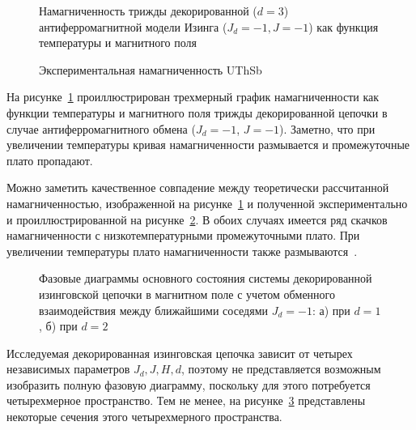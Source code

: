  \begin{figure}[h]
 	\caption{Намагниченность трижды декорированной ($d=3$) антиферромагнитной модели Изинга ($J_d=-1, J=-1$) как функция температуры и магнитного поля}
 	\label{thirdDecorMag}
 \end{figure}

 \begin{figure}[h]
 	\caption{Экспериментальная намагниченность UThSb~\cite{rossat1982}}
 	\label{expMag}
 \end{figure}

На рисунке~\ref{thirdDecorMag} проиллюстрирован трехмерный график намагниченности как функции температуры и магнитного поля трижды декорированной цепочки в случае антиферромагнитного обмена ($J_d=-1$, $J=-1$). Заметно, что при увеличении температуры кривая намагниченности размывается и промежуточные плато пропадают. 

Можно заметить качественное совпадение между теоретически рассчитанной намагниченностью, изображенной на рисунке~\ref{thirdDecorMag} и полученной экспериментально и проиллюстрированной на рисунке~\ref{expMag}. В обоих случаях имеется ряд скачков намагниченности с низкотемпературными промежуточными плато. При увеличении температуры плато намагниченности также размываются~\cite{rossat1982}. 

 \begin{figure}[h]
 	\begin{minipage}{0.47\linewidth}
 	\end{minipage}
 	\hfill
 	\begin{minipage}{0.47\linewidth}
 	\end{minipage}
 	\caption{Фазовые диаграммы основного состояния системы  декорированной изинговской цепочки в магнитном поле с учетом обменного взаимодействия между ближайшими соседями $J_d=-1$: а) при $d=1$, б) при $d=2$}
 	\label{phaseDiag}
 \end{figure}

Исследуемая декорированная изинговская цепочка зависит от четырех независимых параметров $J_d, J, H, d$, поэтому не представляется возможным изобразить полную фазовую диаграмму, поскольку для этого потребуется четырехмерное пространство. Тем не менее, на рисунке~\ref{phaseDiag} представлены некоторые сечения этого четырехмерного пространства.

